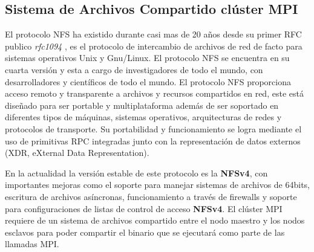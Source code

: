 \documentclass[letterpaper, 12pt, oneside]{article}
\begin{document}
    \subsection{Sistema de Archivos Compartido clúster MPI}
    El protocolo NFS ha existido durante casi mas de 20 años desde su primer RFC publico \textit{rfc1094} \cite{nfsv1}, es el protocolo de intercambio de archivos de red de facto para sistemas operativos Unix y Gnu/Linux. El protocolo NFS se encuentra en su cuarta versión y esta a cargo de investigadores de todo el mundo, con desarrolladores y científicos de todo el mundo. El protocolo NFS proporciona acceso remoto y transparente a archivos y recursos compartidos en red, este está diseñado para ser portable y multiplataforma además de ser soportado en diferentes tipos de máquinas, sistemas operativos, arquitecturas de redes y protocolos de transporte. 
    Su portabilidad y funcionamiento se logra mediante el uso de primitivas RPC integradas junto con la representación de datos externos (XDR, eXternal Data Representation). 
    
    En la actualidad la versión estable de este protocolo es la \textbf{NFSv4},  con importantes mejoras como el soporte para manejar sistemas de archivos de 64bits, escritura de archivos asíncronas, funcionamiento a través de firewalls y soporte  para configuraciones de listas de control de acceso \textbf{NFSv4}. El clúster MPI requiere de un sistema de archivos compartido entre el nodo maestro y los nodos esclavos para poder compartir el binario que se ejecutará como parte de las llamadas MPI. 
    
\end{document}
